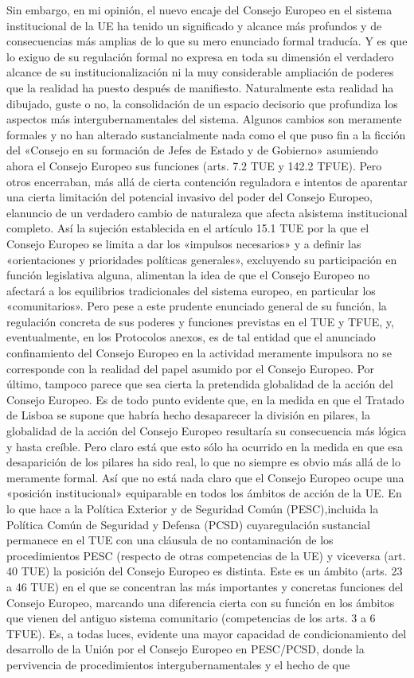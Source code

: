 \documentclass[10pt,a4paper]{article}
\newcounter{anexo}
\begin{document}
Sin embargo, en mi opinión, el nuevo encaje del Consejo Europeo en el sistema institucional de la UE ha tenido un significado y alcance más profundos y de consecuencias más amplias de lo que su mero enunciado formal traducía. Y es que lo exiguo de su regulación formal no expresa en toda su dimensión el verdadero alcance de su institucionalización ni la muy considerable ampliación de poderes que la realidad ha puesto después de manifiesto. Naturalmente esta realidad ha dibujado, guste o no, la consolidación de un espacio decisorio que profundiza los aspectos más intergubernamentales del sistema. Algunos cambios son meramente formales y no han alterado sustancialmente nada como el que puso fin a la ficción del «Consejo en su formación de Jefes de Estado y de Gobierno» asumiendo ahora el Consejo Europeo sus funciones (arts. 7.2 TUE y 142.2 TFUE). Pero otros encerraban, más allá de cierta contención reguladora e intentos de aparentar una cierta limitación del potencial invasivo del poder del Consejo Europeo, elanuncio de un verdadero cambio de naturaleza que afecta alsistema institucional completo. Así la sujeción establecida en el artículo 15.1 TUE por la que el Consejo Europeo se limita a dar los «impulsos necesarios» y a definir las «orientaciones y prioridades políticas generales», excluyendo su participación en función legislativa alguna, alimentan la idea de que el Consejo Europeo no afectará a los equilibrios tradicionales del sistema europeo, en particular los «comunitarios». Pero pese a este prudente enunciado general de su función, la regulación concreta de sus poderes y funciones previstas en el TUE y TFUE, y, eventualmente, en los Protocolos anexos, es de tal entidad que el anunciado confinamiento del Consejo Europeo en la actividad meramente impulsora no se corresponde con la realidad del papel asumido por el Consejo Europeo. Por último, tampoco parece que sea cierta la pretendida globalidad de la acción del Consejo Europeo. Es de todo punto evidente que, en la medida en que el Tratado de Lisboa se supone que habría hecho desaparecer la división en pilares, la globalidad de la acción del Consejo Europeo resultaría su consecuencia más lógica y hasta creíble. Pero claro está que esto sólo ha ocurrido en la medida en que esa desaparición de los pilares ha sido real, lo que no siempre es obvio más allá de lo meramente formal. Así que no está nada claro que el Consejo Europeo ocupe una «posición institucional» equiparable en todos los ámbitos de acción de la UE. En lo que hace a la Política Exterior y de Seguridad Común (PESC),incluida la Política Común de Seguridad y Defensa (PCSD) cuyaregulación sustancial permanece en el TUE con una cláusula de no contaminación de los procedimientos PESC (respecto de otras competencias de la UE) y viceversa (art. 40 TUE) la posición del Consejo Europeo es distinta. Este es un ámbito (arts. 23 a 46 TUE) en el que se concentran las más importantes y concretas funciones del Consejo Europeo, marcando una diferencia cierta con su función en los ámbitos que vienen del antiguo sistema comunitario (competencias de los arts. 3 a 6 TFUE). Es, a todas luces, evidente una mayor capacidad de condicionamiento del desarrollo de la Unión por el Consejo Europeo en PESC/PCSD, donde la pervivencia de procedimientos intergubernamentales y el hecho de que 
\end{document}
